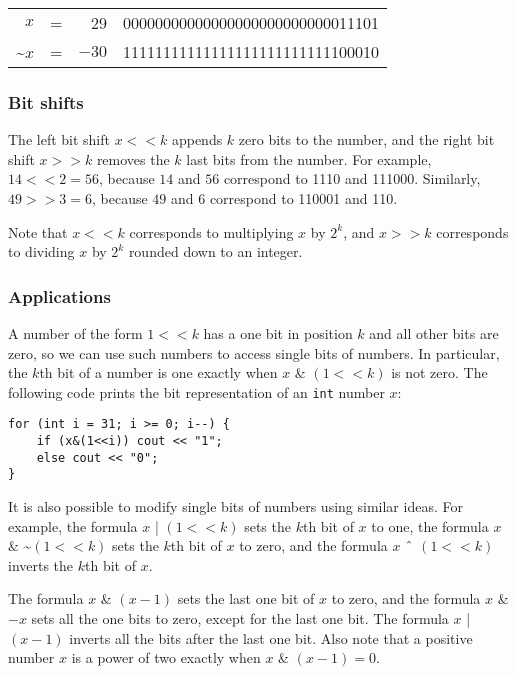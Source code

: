 \begin{center}
\begin{tabular}{rrrr}
$x$ & = & 29 &   00000000000000000000000000011101 \\
\textasciitilde$x$ & = & $-30$ & 11111111111111111111111111100010 \\
\end{tabular}
\end{center}

\subsubsection{Bit shifts}


The left bit shift $x < < k$ appends $k$
zero bits to the number,
and the right bit shift $x > > k$
removes the $k$ last bits from the number.
For example, $14 < < 2 = 56$,
because $14$ and $56$ correspond to 1110 and 111000.
Similarly, $49 > > 3 = 6$,
because $49$ and $6$ correspond to 110001 and 110.

Note that $x < < k$
corresponds to multiplying $x$ by $2^k$,
and $x > > k$
corresponds to dividing $x$ by $2^k$
rounded down to an integer.

\subsubsection{Applications}

A number of the form $1 < < k$ has a one bit
in position $k$ and all other bits are zero,
so we can use such numbers to access single bits of numbers.
In particular, the $k$th bit of a number is one
exactly when $x$ \& $(1 < < k)$ is not zero.
The following code prints the bit representation
of an \texttt{int} number $x$:

\begin{lstlisting}
for (int i = 31; i >= 0; i--) {
    if (x&(1<<i)) cout << "1";
    else cout << "0";
}
\end{lstlisting}

It is also possible to modify single bits
of numbers using similar ideas.
For example, the formula $x$ | $(1 < < k)$
sets the $k$th bit of $x$ to one,
the formula
$x$ \& \textasciitilde $(1 < < k)$
sets the $k$th bit of $x$ to zero,
and the formula
$x$ $\XOR$ $(1 < < k)$
inverts the $k$th bit of $x$.

The formula $x$ \& $(x-1)$ sets the last
one bit of $x$ to zero,
and the formula $x$ \& $-x$ sets all the
one bits to zero, except for the last one bit.
The formula $x$ | $(x-1)$
inverts all the bits after the last one bit.
Also note that a positive number $x$ is
a power of two exactly when $x$ \& $(x-1) = 0$.

